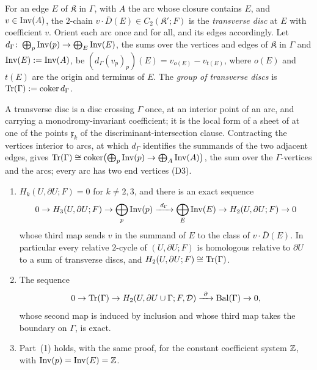 \begin{definition}\label{def:transverse}
For an edge $E$ of $\mathfrak K$ in $\Gamma$, with $A$ the arc whose closure contains $E$, and $v\in\operatorname{Inv}(A)$, the $2$-chain $v\cdot\bar D(E)\in C_2(\mathfrak K';F)$ is
the \emph{transverse disc} at $E$ with coefficient $v$. Orient each arc once and for all, and its edges accordingly.
Let $d_\Gamma \colon\bigoplus_p\operatorname{Inv}(p)\to\bigoplus_E\operatorname{Inv}(E)$, the sums over the vertices and edges of $\mathfrak K$ in
$\Gamma$ and $\operatorname{Inv}(E):=\operatorname{Inv}(A)$, be $(d_\Gamma(v_p)_p)(E)=v_{o(E)}-v_{t(E)}$, where $o(E)$ and $t(E)$ are the origin and
terminus of $E$. The \emph{group of transverse discs} is $\mathrm{Tr}(\Gamma):=\operatorname{coker}d_\Gamma$.
\end{definition}

A transverse disc is a disc crossing $\Gamma$ once, at an interior point of an arc, and carrying a monodromy-invariant
coefficient; it is the local form of a sheet of \cite{CBM} at one of the points $\mathfrak x_k$ of the discriminant-intersection clause. Contracting
the vertices interior to arcs, at which $d_\Gamma$ identifies the summands of the two adjacent edges, gives
$\mathrm{Tr}(\Gamma)\cong\operatorname{coker}\bigl(\bigoplus_{p}\operatorname{Inv}(p)\to\bigoplus_A\operatorname{Inv}(A)\bigr)$, the sum over the
$\Gamma$-vertices and the arcs; every arc has two end vertices (D3).

\begin{lemma}\label{lem:nbhd}
\begin{enumerate}
\item $H_k(U,\partial U;F)=0$ for $k\ne2,3$, and there is an exact sequence
\[
0\to H_3(U,\partial U;F)\to\bigoplus_p\cyInv(p)\xrightarrow{\ d_\Gamma \ }\bigoplus_E\cyInv(E)\to H_2(U,\partial U;F)\to0
\]
whose third map sends $v$ in the summand of $E$ to the class of $v\cdot\bar D(E)$. In particular every relative
$2$-cycle of $(U,\partial U;F)$ is homologous relative to $\partial U$ to a sum of transverse discs, and
$H_2(U,\partial U;F)\cong\mathrm{Tr}(\Gamma)$.
\item The sequence
\[
0\to\cyTr(\Gamma)\to H_2(U,\partial U\cup\Gamma;F,\mathcal D)\xrightarrow{\ \partial\ }\cyBal\to0,
\]
whose second map is induced by inclusion and whose third map takes the boundary on $\Gamma$, is exact.
\item Part~(1) holds, with the same proof, for the constant coefficient system $\mathbb Z$, with $\operatorname{Inv}(p)=\operatorname{Inv}(E)=\mathbb Z$.
\end{enumerate}
\end{lemma}

